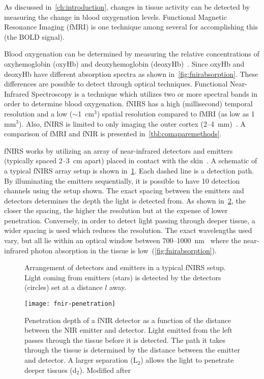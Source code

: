 As discussed in~\cref{ch:introduction}, changes in tissue activity can be detected by measuring the change in blood oxygenation levels.  Functional Magnetic Resonance Imaging (fMRI) is one technique among several for accomplishing this (the BOLD signal).

Blood oxygenation can be determined by measuring the relative concentrations of oxyhemoglobin (oxyHb) and deoxyhemoglobin (deoxyHb)~\citep{ogawa1990,kwong1992,fox1986}.  Since oxyHb and deoxyHb have different absorption spectra as shown in~\cref{fig:fnirabsorption}. These differences are possible to detect  through optical techniques.  Functional Near-Infrared Spectroscopy is a technique which utilizes two or more spectral bands in order to determine blood oxygenation.  fNIRS has a high (millisecond) temporal resolution and a low ($\sim$1~cm$^3$) spatial resolution compared to fMRI (as low as 1 mm$^3$). Also, fNIRS is limited to only imaging the outer cortex (2--4~mm)~\citep{bunce2006}. A comparison of fMRI and fNIR is presented in~\cref{tbl:comaparemethods}.

fNIRS works by utilizing an array of near-infrared detectors and emitters (typically spaced 2--3~cm apart) placed in contact with the skin~\citep{villringer1997,izzetoglu2004}.  A schematic of a typical fNIRS array setup is shown in~\cref{fig:fnir-arragement}. Each dashed line is a detection path. By illuminating the emitters sequentially, it is possible to have 10 detection channels using the setup shown.  The exact spacing between the emitters and detectors determines the depth the light is detected from.  As shown in~\cref{fig:fnirpenetration}, the closer the spacing, the higher the resolution but at the expense of lower penetration.  Conversely, in order to detect light passing through deeper tissue, a wider spacing is used which reduces the resolution.  The exact wavelengths used vary, but all lie within an optical window between 700--1000~nm~\citep{villringer1997} where the near-infrared photon absorption in the tissue is low~(\cref{fig:fnirabsorption}).

\begin{figure}[tb]
  \centering
  
  \caption[Arrangement of detectors and emitters in a typical fNIRS setup]{\label{fig:fnir-arragement}Arrangement of detectors and emitters in a typical fNIRS setup. Light coming from emitters (stars) is detected by the detectors (circles) set at a distance $l$ away.}
\end{figure}
\begin{figure}[tb]
  \centering
  \texttt{[image: fnir-penetration]}
  \caption[Penetration by fNIR]{\label{fig:fnirpenetration}Penetration depth of a fNIR detector as a function of the distance between the NIR emitter and detector.  Light emitted from the left passes through the tissue before it is detected.  The path it takes through the tissue is determined by the distance between the emitter and detector.  A larger separation (L$_2$) allows the light to penetrate deeper tissues (d$_2$).  Modified after~\citep{head2010}}
\end{figure}

